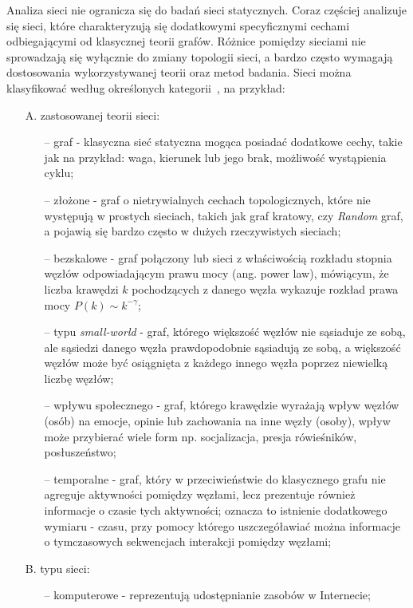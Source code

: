 \documentclass[12pt, oneside, final, openany]{mgr}
\begin{document}
\indent Analiza sieci nie ogranicza się do badań sieci statycznych. Coraz częściej analizuje się sieci, które charakteryzują się dodatkowymi specyficznymi cechami odbiegającymi od klasycznej teorii grafów. Różnice pomiędzy sieciami nie sprowadzają się wyłącznie do zmiany topologii sieci, a bardzo często wymagają dostosowania wykorzystywanej teorii oraz metod badania. Sieci można klasyfikować według określonych kategorii~\cite{BOCCALETTI2006175, HOLME201297}, na przykład:
\begin{itemize}
\item[A.] zastosowanej teorii sieci:
	\begin{itemize}
	\item[--] graf - klasyczna sieć statyczna mogąca posiadać dodatkowe cechy, takie jak na przykład: waga, kierunek lub jego brak, możliwość wystąpienia cyklu; 
	\item[--] złożone - graf o nietrywialnych cechach topologicznych, które nie występują w prostych sieciach, takich jak graf kratowy, czy \textit{Random} graf, a pojawią się bardzo często w dużych rzeczywistych sieciach;
	\item[--] bezskalowe - graf połączony lub sieci z właściwością rozkładu stopnia węzłów odpowiadającym prawu mocy (ang. power law), mówiącym, że liczba krawędzi $k$ pochodzących z danego węzła wykazuje rozkład prawa mocy $P(k) \sim k^{-\gamma}$;
	\item[--] typu \textit{small-world} - graf, którego większość węzłów nie sąsiaduje ze sobą, ale sąsiedzi danego węzła prawdopodobnie sąsiadują ze sobą, a większość węzłów może być osiągnięta z każdego innego węzła poprzez niewielką liczbę węzłów;
	\item[--] wpływu społecznego - graf, którego krawędzie wyrażają wpływ węzłów (osób) na emocje, opinie lub zachowania na inne węzły (osoby), wpływ może przybierać wiele form np. socjalizacja, presja rówieśników, posłuszeństwo;
	\item[--] temporalne - graf, który w przeciwieństwie do klasycznego grafu nie agreguje aktywności pomiędzy węzłami, lecz prezentuje również informacje o czasie tych aktywności; oznacza to istnienie dodatkowego wymiaru - czasu, przy pomocy którego uszczegóławiać można informacje o tymczasowych sekwencjach interakcji pomiędzy węzłami;   
	\end{itemize}
\item[B.] typu sieci:
	\begin{itemize}
	\item[--] komputerowe - reprezentują udostępnianie zasobów w Internecie; 

\end{itemize}
\end{itemize}
\end{document}
